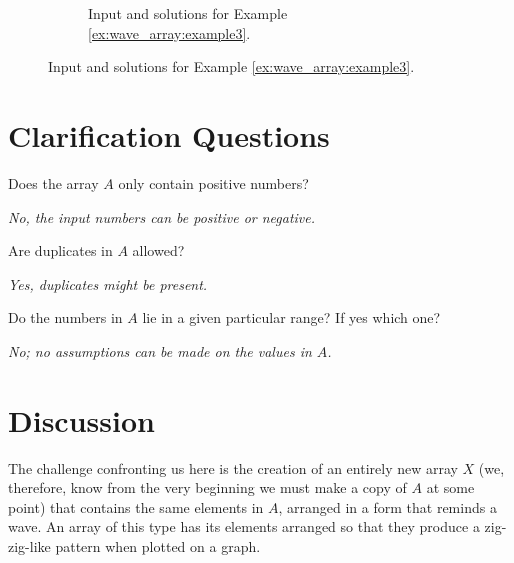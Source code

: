 \begin{figure}
\begin{subfigure}[t]{0.80\textwidth}
		 \caption{Input and solutions for Example \ref{ex:wave_array:example3}.}
		 \label{fig:wave_array:example13}
	  \end{subfigure}
\end{figure}


\section{Clarification Questions}

\begin{QandA}
	\begin{questionitem} \begin{question} Does the array $A$ only contain positive numbers?  \end{question} 	 
    \begin{answered}
		\textit{No, the input numbers can be positive or negative.}
	\end{answered} \end{questionitem}
	\begin{questionitem} \begin{question} Are duplicates in $A$ allowed?  \end{question} 	 
    \begin{answered}
		\textit{Yes, duplicates might be present.}
	\end{answered} \end{questionitem}
	\begin{questionitem} \begin{question} Do the numbers in $A$ lie in a given particular range? If yes which one?  \end{question} 	 
    \begin{answered}
		\textit{No; no assumptions can be made on the values in $A$.}
	\end{answered} \end{questionitem}
\end{QandA}

\section{Discussion}
\label{wave_array:sec:discussion}
The challenge confronting us here is the creation of an entirely new array $X$ (we, therefore, know from the very beginning we must make a copy of $A$ at some point) that contains the same elements in $A$, arranged in a form that reminds a wave. 
An array of this type has its elements arranged so that they produce a zig-zig-like pattern when plotted on a graph. 

